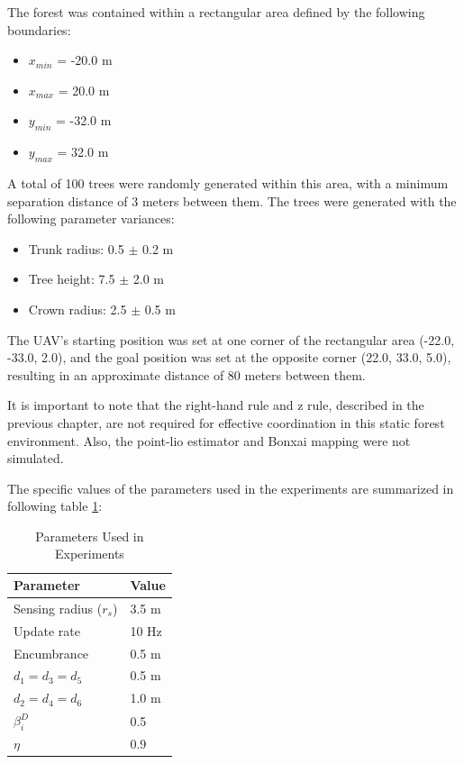             The forest was contained within a rectangular area defined by the following boundaries:
            \begin{itemize}
                \item $x_{min}$ = -20.0 m
                \item $x_{max}$ =  20.0 m
                \item $y_{min}$ = -32.0 m
                \item $y_{max}$ =  32.0 m
            \end{itemize}
            A total of 100 trees were randomly generated within this area, with a minimum separation distance of 3 meters between them. 
            The trees were generated with the following parameter variances:
            \begin{itemize}
                \item Trunk radius: 0.5 $\pm$ 0.2 m
                \item Tree height: 7.5 $\pm$ 2.0 m
                \item Crown radius: 2.5 $\pm$ 0.5 m
            \end{itemize}
            The UAV's starting position was set at one corner of the rectangular area (-22.0, -33.0, 2.0), and the goal position was set at the opposite corner (22.0, 33.0, 5.0), resulting in an approximate distance of 80 meters between them.

            It is important to note that the right-hand rule and z rule, described in the previous chapter, are not required for effective coordination in this static forest environment.
            Also, the point-lio estimator and Bonxai mapping were not simulated.

            The specific values of the parameters used in the experiments are summarized in following table \ref{tab:rbl_forest_simulation_parameters}:
            \begin{table}[H]
                \centering
                \caption{Parameters Used in Experiments}
                \begin{tabular}{|l|l|}
                    \hline
                    Parameter & Value \\
                    \hline
                    \hline
                    Sensing radius ($r_s$) & 3.5 m \\ \hline
                    Update rate & 10 Hz \\ \hline
                    Encumbrance & 0.5 m \\ \hline
                    $d_1 = d_3 = d_5$ & 0.5 m \\ \hline
                    $d_2 = d_4 = d_6$ & 1.0 m \\ \hline
                    $\beta_i^D$ & 0.5  \\ \hline
                    $\eta$ & 0.9  \\ \hline
                \end{tabular}
                \label{tab:rbl_forest_simulation_parameters}
            \end{table}
            
